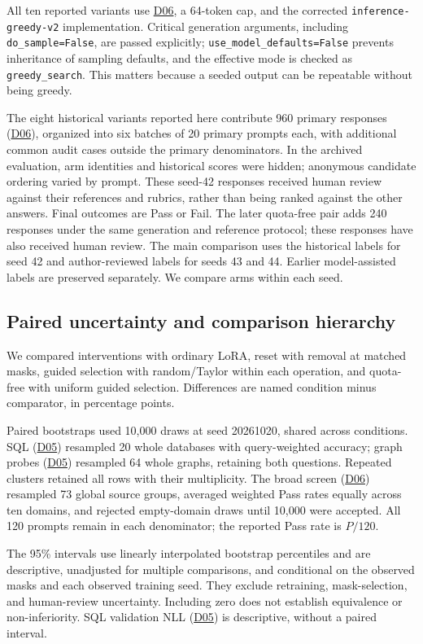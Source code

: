 \documentclass[10pt,letterpaper]{article}
\DeclareRobustCommand{\dataset}[1]{\hyperlink{dataset-#1}{\textnormal{#1}}}
\begin{document}
All ten reported variants use \dataset{D06}, a 64-token cap, and the corrected
\texttt{inference-greedy-v2} implementation. Critical generation arguments,
including \nolinkurl{do_sample=False}, are passed explicitly;
\nolinkurl{use_model_defaults=False} prevents inheritance of sampling defaults,
and the effective mode is checked as \texttt{greedy\_search}. This matters
because a seeded output can be repeatable without being greedy.

The eight historical variants reported here contribute 960 primary
responses (\dataset{D06}), organized into six batches of 20 primary prompts each, with
additional common audit cases outside the primary denominators.
In the archived evaluation, arm identities and historical scores were
hidden; anonymous candidate ordering varied by prompt.
These seed-42 responses received human review against their references
and rubrics, rather than being ranked against the other answers.
Final outcomes are Pass or Fail.
The later quota-free pair adds 240 responses under the same generation and
reference protocol; these responses have also received human review.
The main comparison uses the historical
labels for seed 42 and author-reviewed labels for seeds 43 and 44.
Earlier model-assisted labels are preserved separately. We compare arms within each seed.

\subsection{Paired uncertainty and comparison hierarchy}
\label{sec:uncertainty}

We compared interventions with ordinary LoRA, reset with removal at matched
masks, guided selection with random/Taylor within each operation, and
quota-free with uniform guided selection. Differences are named condition
minus comparator, in percentage points.

Paired bootstraps used 10,000 draws at seed 20261020, shared across conditions.
SQL (\dataset{D05}) resampled 20 whole databases with query-weighted accuracy;
graph probes (\dataset{D05}) resampled 64 whole graphs, retaining both questions. Repeated clusters
retained all rows with their multiplicity. The broad screen (\dataset{D06}) resampled
73 global source groups, averaged weighted Pass rates equally across ten
domains, and rejected empty-domain draws until 10,000 were accepted.
All 120 prompts remain in each denominator; the reported Pass rate is
$P/120$.

The 95\% intervals use linearly interpolated bootstrap percentiles and are
descriptive, unadjusted for multiple comparisons, and conditional on the
observed masks and each observed training seed. They exclude retraining,
mask-selection, and human-review uncertainty. Including zero does not establish equivalence or
non-inferiority. SQL validation NLL (\dataset{D05}) is descriptive, without a paired interval.
\end{document}
